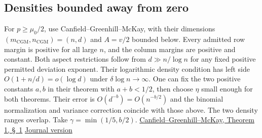 \subsection{Densities bounded away from zero}

For $p\ge \mu_0/2$, use Canfield--Greenhill--McKay, with their dimensions $(m_{\mathrm{CGM}},n_{\mathrm{CGM}})=(n,d)$ and $A=v/2$ bounded below. Every admitted row margin is positive for all large $n$, and the column margins are positive and constant. Both aspect restrictions follow from $d\gg n/\log n$ for any fixed positive permitted deviation exponent. Their logarithmic density condition has left side $O(1+n/d)=o(\log d)$ under $\delta\log n\to\infty$. One can fix the two positive constants $a,b$ in their theorem with $a+b<1/2$, then choose $\eta$ small enough for both theorems. Their error is $O(d^{-b})=O(n^{-b/2})$ and the binomial normalization and variance correction coincide with those above. The two density ranges overlap. Take $\gamma=\min(1/5,b/2)$. \href{https://web.maths.unsw.edu.au/~csg/papers/CGM.pdf\#page=2}{Canfield--Greenhill--McKay, Theorem 1, \S~1} \quad \href{https://doi.org/10.1016/j.jcta.2007.03.009}{Journal version}
